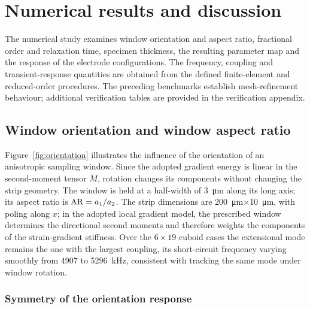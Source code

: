 \FloatBarrier
\section{Numerical results and discussion}
\label{sec:results}

The numerical study examines window orientation and aspect ratio,
fractional order and relaxation time, specimen thickness, the resulting
parameter map and the response of the electrode configurations. The frequency, coupling and transient-response quantities are obtained from
the defined finite-element and reduced-order procedures. The preceding
benchmarks establish mesh-refinement behaviour; additional verification
tables are provided in the verification appendix.

\FloatBarrier
\subsection{Window orientation and window aspect ratio}
\label{sec:orientation}

Figure~\ref{fig:orientation} illustrates the influence of the orientation
of an anisotropic sampling window. Since the adopted gradient energy is linear
in the second-moment tensor $M$, rotation changes its components without
changing the strip geometry. The window is held at a
half-width of \SI{3}{\micro\meter} along its long axis; its aspect ratio is
${\rm AR}=a_1/a_2$. The strip dimensions are
\SI{200}{\micro\meter}$\times$\SI{10}{\micro\meter}, with poling along $x$; in the adopted local gradient model, the prescribed window determines
the directional second moments and therefore weights the components of the
strain-gradient stiffness. Over the $6\times19$ cuboid cases the extensional mode remains the one
with the largest coupling, its short-circuit frequency varying smoothly from
$4907$ to \SI{5296}{kHz}, consistent with tracking the same mode under window rotation.

\subsubsection{Symmetry of the orientation response}

